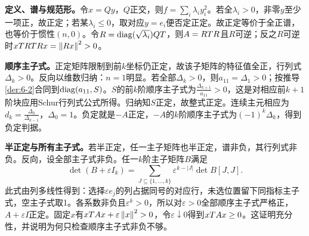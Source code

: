 \label{der:6-3}
\textbf{定义、谱与规范形。}令$x=Qy$，$Q$正交，则$f=\sum_i\lambda_i y_i^2$。若全$\lambda_i>0$，非零$y$至少一项正，故正定；若某$\lambda_i\le0$，取对应$y=e_i$便否定正定。故正定等价于全正谱，也等价于惯性$(n,0)$。令$R=\operatorname{diag}(\sqrt{\lambda_i})QT$，则$A=RT R$且$R$可逆；反之$R$可逆时$xT RT Rx=\left\lVert Rx\right\rVert^2>0$。

\textbf{顺序主子式。}正定矩阵限制到前$k$坐标仍正定，故该子矩阵的特征值全正，行列式$\Delta_k>0$。反向以维数归纳：$n=1$明显。若全部$\Delta_k>0$，则$a_{11}=\Delta_1>0$；按推导\ref{der:6-2}合同到$\operatorname{diag}(a_{11},S)$。$S$的前$k$阶顺序主子式为$\frac{\Delta_{k+1}}{a_{11}}>0$，这是对相应前$k+1$阶块应用Schur行列式公式所得。归纳知$S$正定，故整式正定。连续主元相应为$d_k=\frac{\Delta_k}{\Delta_{k-1}}$，$\Delta_0=1$。负定就是$-A$正定，$-A$的$k$阶顺序主子式为$(-1)^k\Delta_k$，得到负定判据。

\textbf{半正定与所有主子式。}若半正定，任一主子矩阵也半正定，谱非负，其行列式非负。反向，设全部主子式非负。任一$k$阶主子矩阵$B$满足
\[\det(B+\varepsilon I_k)=\sum_{J\subseteq\{1,\ldots,k\}}\varepsilon^{k-|J|}\det B[J,J].\]
此式由列多线性得到：选择$\varepsilon e_j$的列占据同号的对应行，未选位置留下同指标主子式，空主子式取1。各系数非负且$\varepsilon^k>0$，所以对$\varepsilon>0$全部顺序主子式严格正，$A+\varepsilon I$正定。固定$x$有$xT Ax+\varepsilon\left\lVert x\right\rVert^2>0$，令$\varepsilon\downarrow0$得到$xT Ax\ge0$。这证明充分性，并说明为何只检查顺序主子式非负不够。
